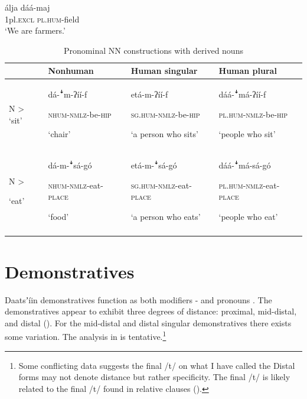 \documentclass[output=paper]{langsci/langscibook}
\begin{document}
\ex\label{ex:ahlandc:55b}
\gll
\'{a}lja             d\'{a}\'{a}-maj \\
  1pl\textsc{.excl}   \textsc{pl.hum}{}-field\\
  \glt
  ‘We are farmers.’
\z 
\z


\begin{table}
\begin{tabularx}{\textwidth}{lXXX}
\lsptoprule & \multicolumn{1}{X}{Nonhuman} & \multicolumn{1}{X}{Human singular} & Human plural\\
\midrule
\textmd{N {\textgreater}} \textmd{‘sit’} & {d\'{a}-\textsf{ꜜ}m-ʔ\'{i}\'{i}-f   }

\textsc{nhum-nmlz-}be\textsc{{}-hip  }

‘chair’ & {et\'{a}-m-ʔ\'{i}\'{i}-f  }

\textsc{sg.hum-nmlz-}be\textsc{{}-hip           }

\mdseries ‘a person who sits’ & {d\'{a}\'{a}-\textsf{ꜜ}m\'{a}-ʔ\'{i}\'{i}-f}

\textsc{pl.hum-nmlz-}be\textsc{{}-hip  }

\mdseries ‘people who sit’\\
\midrule
{\mdseries N {\textgreater}}

\mdseries ‘eat’ & {d\'{a}-m-\textsf{ꜜ}s\'{a}-g\'{o}  }

\textsc{nhum-nmlz-}eat\textsc{{}-place  }

\mdseries ‘food’ & {et\'{a}-m-\textsf{ꜜ}s\'{a}-g\'{o}}

\textsc{sg.hum-nmlz-}eat\textsc{{}-place}

\mdseries ‘a person who eats’ & {d\'{a}\'{a}-\textsf{ꜜ}m\'{a}-s\'{a}-g\'{o}  }

\textsc{pl.hum-nmlz-}eat\textsc{{}-place}

\mdseries ‘people who eat’\\
\lspbottomrule
\end{tabularx}
\caption{Pronominal NN constructions with derived nouns}
\label{tab:ahlandc:10}
\end{table}

\section{Demonstratives}\label{sec:ahlandc:9}

Daatsʼ\'{i}in demonstratives function as both modifiers - and pronouns . The demonstratives appear to exhibit three degrees of distance: proximal, mid-distal, and distal (). For the mid-distal and distal singular demonstratives there exists some variation. The analysis in  is tentative.\footnote{Some conflicting data suggests the final /t/ on what I have called the Distal forms may not denote distance but rather specificity. The final /t/ is likely related to the final /t/ found in relative clauses ().}
\end{document}
